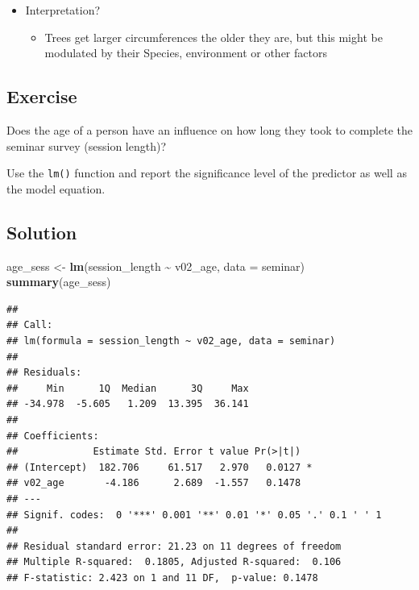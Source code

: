 \documentclass[
]{book}
\newenvironment{Shaded}{\begin{snugshade}}{\end{snugshade}}
\newcommand{\AttributeTok}[1]{\textcolor[rgb]{0.13,0.29,0.53}{#1}}
\newcommand{\FunctionTok}[1]{\textcolor[rgb]{0.13,0.29,0.53}{\textbf{#1}}}
\newcommand{\NormalTok}[1]{#1}
\newcommand{\OtherTok}[1]{\textcolor[rgb]{0.56,0.35,0.01}{#1}}
\newcommand{\SpecialCharTok}[1]{\textcolor[rgb]{0.81,0.36,0.00}{\textbf{#1}}}
\providecommand{\tightlist}{%
  \setlength{\itemsep}{0pt}\setlength{\parskip}{0pt}}
\begin{document}
\begin{itemize}
\tightlist
\item
  Interpretation?

  \begin{itemize}
  \tightlist
  \item
    Trees get larger circumferences the older they are, but this might be modulated by their Species, environment or other factors
  \end{itemize}
\end{itemize}

\subsection{\texorpdfstring{Exercise }{Exercise  }}\label{exercise-9}

Does the age of a person have an influence on how long they took to complete the seminar survey (session length)?

Use the \texttt{lm()} function and report the significance level of the predictor as well as the model equation.

\subsection{Solution}\label{solution-13}

\begin{Shaded}
\begin{Highlighting}[]
\NormalTok{age\_sess }\OtherTok{\textless{}{-}} \FunctionTok{lm}\NormalTok{(session\_length }\SpecialCharTok{\textasciitilde{}}\NormalTok{ v02\_age, }\AttributeTok{data =}\NormalTok{ seminar)}
\FunctionTok{summary}\NormalTok{(age\_sess)}
\end{Highlighting}
\end{Shaded}

\begin{verbatim}
## 
## Call:
## lm(formula = session_length ~ v02_age, data = seminar)
## 
## Residuals:
##     Min      1Q  Median      3Q     Max 
## -34.978  -5.605   1.209  13.395  36.141 
## 
## Coefficients:
##             Estimate Std. Error t value Pr(>|t|)  
## (Intercept)  182.706     61.517   2.970   0.0127 *
## v02_age       -4.186      2.689  -1.557   0.1478  
## ---
## Signif. codes:  0 '***' 0.001 '**' 0.01 '*' 0.05 '.' 0.1 ' ' 1
## 
## Residual standard error: 21.23 on 11 degrees of freedom
## Multiple R-squared:  0.1805, Adjusted R-squared:  0.106 
## F-statistic: 2.423 on 1 and 11 DF,  p-value: 0.1478
\end{verbatim}
\end{document}
